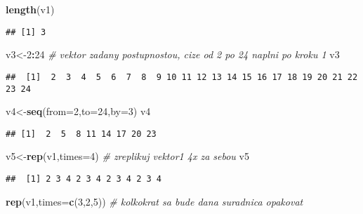 \documentclass[
]{article}
\newenvironment{Shaded}{\begin{snugshade}}{\end{snugshade}}
\newcommand{\AttributeTok}[1]{\textcolor[rgb]{0.13,0.29,0.53}{#1}}
\newcommand{\CommentTok}[1]{\textcolor[rgb]{0.56,0.35,0.01}{\textit{#1}}}
\newcommand{\DecValTok}[1]{\textcolor[rgb]{0.00,0.00,0.81}{#1}}
\newcommand{\FunctionTok}[1]{\textcolor[rgb]{0.13,0.29,0.53}{\textbf{#1}}}
\newcommand{\NormalTok}[1]{#1}
\newcommand{\OtherTok}[1]{\textcolor[rgb]{0.56,0.35,0.01}{#1}}
\newcommand{\SpecialCharTok}[1]{\textcolor[rgb]{0.81,0.36,0.00}{\textbf{#1}}}
\begin{document}
\begin{Shaded}
\begin{Highlighting}[]
\FunctionTok{length}\NormalTok{(v1)}
\end{Highlighting}
\end{Shaded}

\begin{verbatim}
## [1] 3
\end{verbatim}

\begin{Shaded}
\begin{Highlighting}[]
\NormalTok{v3}\OtherTok{\textless{}{-}}\DecValTok{2}\SpecialCharTok{:}\DecValTok{24} \CommentTok{\# vektor zadany postupnostou, cize od 2 po 24 naplni po kroku 1}
\NormalTok{v3}
\end{Highlighting}
\end{Shaded}

\begin{verbatim}
##  [1]  2  3  4  5  6  7  8  9 10 11 12 13 14 15 16 17 18 19 20 21 22 23 24
\end{verbatim}

\begin{Shaded}
\begin{Highlighting}[]
\NormalTok{v4}\OtherTok{\textless{}{-}}\FunctionTok{seq}\NormalTok{(}\AttributeTok{from=}\DecValTok{2}\NormalTok{,}\AttributeTok{to=}\DecValTok{24}\NormalTok{,}\AttributeTok{by=}\DecValTok{3}\NormalTok{)}
\NormalTok{v4}
\end{Highlighting}
\end{Shaded}

\begin{verbatim}
## [1]  2  5  8 11 14 17 20 23
\end{verbatim}

\begin{Shaded}
\begin{Highlighting}[]
\NormalTok{v5}\OtherTok{\textless{}{-}}\FunctionTok{rep}\NormalTok{(v1,}\AttributeTok{times=}\DecValTok{4}\NormalTok{) }\CommentTok{\# zreplikuj vektor1 4x  za sebou}
\NormalTok{v5}
\end{Highlighting}
\end{Shaded}

\begin{verbatim}
##  [1] 2 3 4 2 3 4 2 3 4 2 3 4
\end{verbatim}

\begin{Shaded}
\begin{Highlighting}[]
\FunctionTok{rep}\NormalTok{(v1,}\AttributeTok{times=}\FunctionTok{c}\NormalTok{(}\DecValTok{3}\NormalTok{,}\DecValTok{2}\NormalTok{,}\DecValTok{5}\NormalTok{)) }\CommentTok{\# kolkokrat sa bude dana suradnica opakovat}
\end{Highlighting}
\end{Shaded}
\end{document}
